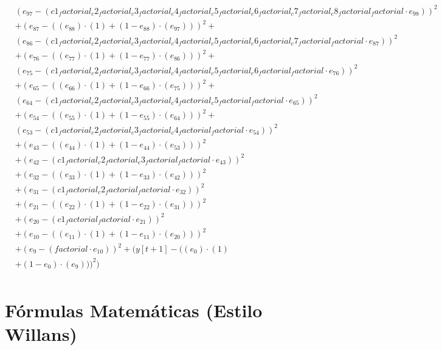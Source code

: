 \documentclass[10pt, a4paper]{article}
\begin{document}
\begin{small}
\begin{align*}
& (e_{97} - (c1_factorial_c2_factorial_c3_factorial_c4_factorial_c5_factorial_c6_factorial_c7_factorial_c8_factorial_factorial  \cdot  e_{98}))^{2} \\
& + (e_{87} - ((e_{88})  \cdot  (1) + (1 - e_{88})  \cdot  (e_{97})))^{2} + \\
& (e_{86} - (c1_factorial_c2_factorial_c3_factorial_c4_factorial_c5_factorial_c6_factorial_c7_factorial_factorial  \cdot  e_{87}))^{2} \\
& + (e_{76} - ((e_{77})  \cdot  (1) + (1 - e_{77})  \cdot  (e_{86})))^{2} + \\
& (e_{75} - (c1_factorial_c2_factorial_c3_factorial_c4_factorial_c5_factorial_c6_factorial_factorial  \cdot  e_{76}))^{2} \\
& + (e_{65} - ((e_{66})  \cdot  (1) + (1 - e_{66})  \cdot  (e_{75})))^{2} + \\
& (e_{64} - (c1_factorial_c2_factorial_c3_factorial_c4_factorial_c5_factorial_factorial  \cdot  e_{65}))^{2} \\
& + (e_{54} - ((e_{55})  \cdot  (1) + (1 - e_{55})  \cdot  (e_{64})))^{2} + \\
& (e_{53} - (c1_factorial_c2_factorial_c3_factorial_c4_factorial_factorial  \cdot  e_{54}))^{2} \\
& + (e_{43} - ((e_{44})  \cdot  (1) + (1 - e_{44})  \cdot  (e_{53})))^{2} \\
& + (e_{42} - (c1_factorial_c2_factorial_c3_factorial_factorial  \cdot  e_{43}))^{2} \\
& + (e_{32} - ((e_{33})  \cdot  (1) + (1 - e_{33})  \cdot  (e_{42})))^{2} \\
& + (e_{31} - (c1_factorial_c2_factorial_factorial  \cdot  e_{32}))^{2} \\
& + (e_{21} - ((e_{22})  \cdot  (1) + (1 - e_{22})  \cdot  (e_{31})))^{2} \\
& + (e_{20} - (c1_factorial_factorial  \cdot  e_{21}))^{2} \\
& + (e_{10} - ((e_{11})  \cdot  (1) + (1 - e_{11})  \cdot  (e_{20})))^{2} \\
& + (e_{9} - (factorial  \cdot  e_{10}))^{2} + (y[t+1] - ((e_{0})  \cdot  (1) \\
& + (1 - e_{0})  \cdot  (e_{9})))^{2}) \\
\end{align*}
\end{small}\part{Fórmulas Matemáticas (Estilo Willans)}
\end{document}
